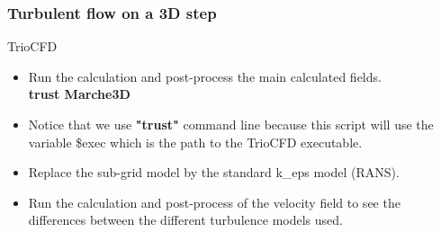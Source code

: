 \documentclass[10pt, hyperref={unicode=true,pdfusetitle, bookmarks=true,bookmarksnumbered=false,bookmarksopen=false, breaklinks=false,pdfborder={0 0 1},backref=true,colorlinks=true,linkcolor=darkblue,pageanchor}]{beamer}
\begin{document}
\begin{frame}
\frametitle{Turbulent flow on a 3D step}
\begin{block}{TrioCFD}

\begin{itemize}

\item Run the calculation and post-process the main calculated fields.\\
\textbf{trust Marche3D} \\

\item Notice that we use \textbf{"trust"} command line because this script will use the variable \$exec which is the path to the TrioCFD executable.

\item Replace the sub-grid model by the standard k\_eps model (RANS).
\item Run the calculation and post-process of the velocity field to see the differences between the different turbulence models used.
\end{itemize}

\end{block}
\end{frame}
\end{document}
